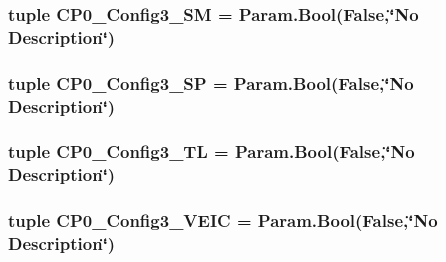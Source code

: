 \label{classMipsCPU_1_1BaseMipsCPU_a7a0cc3ea582b4012a1e0029b494c6751}
\hypertarget{classMipsCPU_1_1BaseMipsCPU_a621a332c019b66f6c8887eb42268d482}{
\subsubsection[{CP0\_\-Config3\_\-SM}]{\setlength{\rightskip}{0pt plus 5cm}tuple {\bf CP0\_\-Config3\_\-SM} = Param.Bool(False,\char`\"{}No Description\char`\"{})}}
\label{classMipsCPU_1_1BaseMipsCPU_a621a332c019b66f6c8887eb42268d482}
\hypertarget{classMipsCPU_1_1BaseMipsCPU_aede7a22f4fed840b65f555541f6a021f}{
\subsubsection[{CP0\_\-Config3\_\-SP}]{\setlength{\rightskip}{0pt plus 5cm}tuple {\bf CP0\_\-Config3\_\-SP} = Param.Bool(False,\char`\"{}No Description\char`\"{})}}
\label{classMipsCPU_1_1BaseMipsCPU_aede7a22f4fed840b65f555541f6a021f}
\hypertarget{classMipsCPU_1_1BaseMipsCPU_a2a738d8d82ad8b446ad32fc87a285cc1}{
\subsubsection[{CP0\_\-Config3\_\-TL}]{\setlength{\rightskip}{0pt plus 5cm}tuple {\bf CP0\_\-Config3\_\-TL} = Param.Bool(False,\char`\"{}No Description\char`\"{})}}
\label{classMipsCPU_1_1BaseMipsCPU_a2a738d8d82ad8b446ad32fc87a285cc1}
\hypertarget{classMipsCPU_1_1BaseMipsCPU_a889a4f646c6296aec6e3bf2efca23faf}{
\subsubsection[{CP0\_\-Config3\_\-VEIC}]{\setlength{\rightskip}{0pt plus 5cm}tuple {\bf CP0\_\-Config3\_\-VEIC} = Param.Bool(False,\char`\"{}No Description\char`\"{})}}
